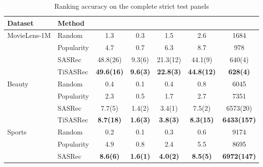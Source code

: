\begin{table}[!htbp]
\centering
\caption{Ranking accuracy on the complete strict test panels}
\label{tab:accuracy}
\fontsize{8.5}{11}\selectfont
\setlength{\tabcolsep}{2.5pt}
\renewcommand{\arraystretch}{1.12}
\noindent\begin{tabular*}{\textwidth}{@{\extracolsep{\fill}}llS[table-format=2.1(3)]S[table-format=2.1(3)]S[table-format=2.1(3)]S[table-format=2.1(3)]S[table-format=5.0(3),table-align-uncertainty=false]@{}}
\toprule
Dataset & Method & {} & {} & {} & {} & {}\\
\midrule
MovieLens-1M & Random & 1.3 & 0.3 & 1.5 & 2.6 & 1684\\ %
 & Popularity & 4.7 & 0.7 & 6.3 & 8.7 & 978\\ %
 & SASRec & 48.8(26) & 9.3(6) & 21.3(12) & 44.1(9) & 640(4)\\ %
 & TiSASRec & \bfseries 49.6(16) & \bfseries 9.6(3) & \bfseries 22.8(3) & \bfseries 44.8(12) & \bfseries 628(4)\\ %
\midrule
Beauty & Random & 0.4 & 0.1 & 0.4 & 0.8 & 6045\\ %
 & Popularity & 2.3 & 0.5 & 1.7 & 2.7 & 7351\\ %
 & SASRec & 7.7(5) & 1.4(2) & 3.4(1) & 7.5(2) & 6573(20)\\ %
 & TiSASRec & \bfseries 8.7(18) & \bfseries 1.6(3) & \bfseries 3.8(3) & \bfseries 8.3(15) & \bfseries 6433(157)\\ %
\midrule
Sports & Random & 0.2 & 0.1 & 0.3 & 0.6 & 9174\\ %
 & Popularity & 4.9 & 0.8 & 2.4 & 5.5 & 8695\\ %
 & SASRec & \bfseries 8.6(6) & \bfseries 1.6(1) & \bfseries 4.0(2) & \bfseries 8.5(5) & \bfseries 6972(147)\\ %

\end{tabular*}
\end{table}
